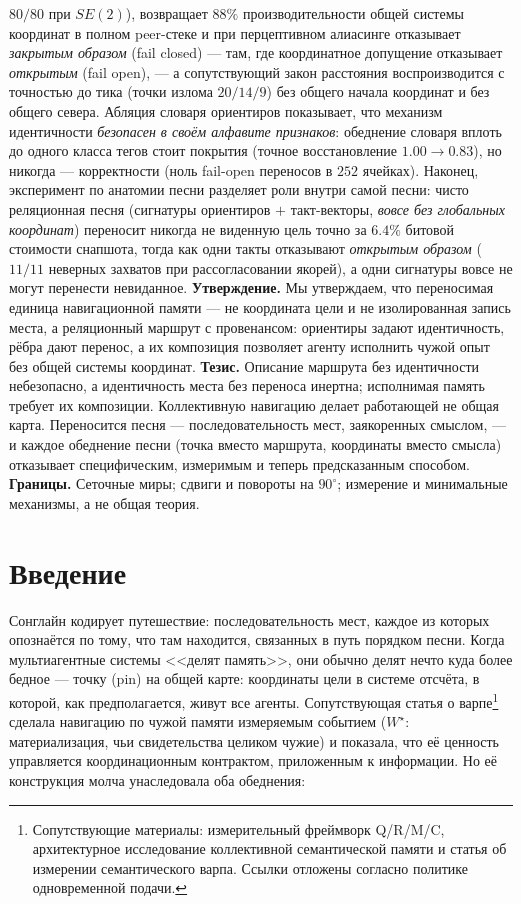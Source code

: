 \documentclass{article}
\newcommand{\wstar}{W^{\star}}
\begin{document}
$80/80$ при $SE(2)$), возвращает $88\%$ производительности общей системы
координат в полном peer-стеке и при перцептивном алиасинге отказывает
\emph{закрытым образом} (fail closed) --- там, где координатное
допущение отказывает \emph{открытым} (fail open), --- а сопутствующий
закон расстояния воспроизводится с точностью до тика (точки излома
$20/14/9$) без общего начала координат и без общего севера. Абляция
словаря ориентиров показывает, что механизм идентичности
\emph{безопасен в своём алфавите признаков}: обеднение словаря вплоть
до одного класса тегов стоит покрытия (точное восстановление $1.00 \to
0.83$), но никогда --- корректности (ноль fail-open переносов в $252$
ячейках). Наконец, эксперимент по анатомии песни разделяет роли внутри
самой песни: чисто реляционная песня (сигнатуры ориентиров $+$
такт-векторы, \emph{вовсе без глобальных координат}) переносит никогда
не виденную цель точно за $6.4\%$ битовой стоимости снапшота, тогда
как одни такты отказывают \emph{открытым образом} ($11/11$ неверных
захватов при рассогласовании якорей), а одни сигнатуры вовсе не могут
перенести невиданное.
\textbf{Утверждение.} Мы утверждаем, что переносимая единица навигационной памяти --- не координата цели и не изолированная запись места, а реляционный маршрут с провенансом: ориентиры задают идентичность, рёбра дают перенос, а их композиция позволяет агенту исполнить чужой опыт без общей системы координат.
\textbf{Тезис.} Описание маршрута без идентичности небезопасно, а идентичность места без переноса инертна; исполнимая память требует их композиции. Коллективную навигацию делает работающей не общая карта.
Переносится песня --- последовательность мест, заякоренных смыслом, ---
и каждое обеднение песни (точка вместо маршрута, координаты вместо
смысла) отказывает специфическим, измеримым и теперь предсказанным
способом.
\textbf{Границы.} Сеточные миры; сдвиги и повороты на $90^\circ$;
измерение и минимальные механизмы, а не общая теория.

\FloatBarrier
\section{Введение}
\label{p3:sec:intro}

Сонглайн кодирует путешествие: последовательность мест, каждое из
которых опознаётся по тому, что там находится, связанных в путь
порядком песни. Когда мультиагентные системы <<делят память>>, они
обычно делят нечто куда более бедное --- точку (pin) на общей карте:
координаты цели в системе отсчёта, в которой, как предполагается,
живут все агенты. Сопутствующая статья о варпе\footnote{Сопутствующие
материалы: измерительный фреймворк Q/R/M/C, архитектурное исследование
коллективной семантической памяти и статья об измерении семантического
варпа. Ссылки отложены согласно политике одновременной подачи.} сделала
навигацию по чужой памяти измеряемым событием ($\wstar$: материализация,
чьи свидетельства целиком чужие) и показала, что её ценность управляется
координационным контрактом, приложенным к информации. Но её конструкция
молча унаследовала оба обеднения:
\end{document}
